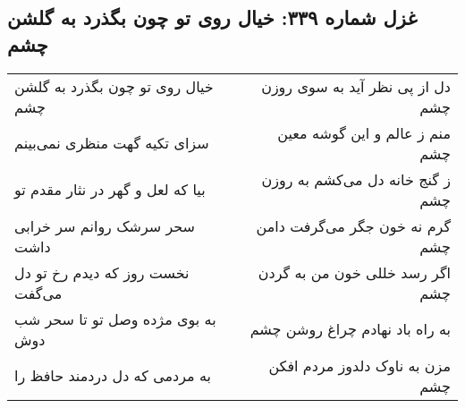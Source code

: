 \begin{center}
\section*{غزل شماره ۳۳۹: خیال روی تو چون بگذرد به گلشن چشم}
\label{sec:sh339}
\begin{longtable}{l p{0.5cm} r}
خیال روی تو چون بگذرد به گلشن چشم
&&
دل از پی نظر آید به سوی روزن چشم
\\
سزای تکیه گهت منظری نمی‌بینم
&&
منم ز عالم و این گوشه معین چشم
\\
بیا که لعل و گهر در نثار مقدم تو
&&
ز گنج خانه دل می‌کشم به روزن چشم
\\
سحر سرشک روانم سر خرابی داشت
&&
گرم نه خون جگر می‌گرفت دامن چشم
\\
نخست روز که دیدم رخ تو دل می‌گفت
&&
اگر رسد خللی خون من به گردن چشم
\\
به بوی مژده وصل تو تا سحر شب دوش
&&
به راه باد نهادم چراغ روشن چشم
\\
به مردمی که دل دردمند حافظ را
&&
مزن به ناوک دلدوز مردم افکن چشم
\\
\end{longtable}
\end{center}
